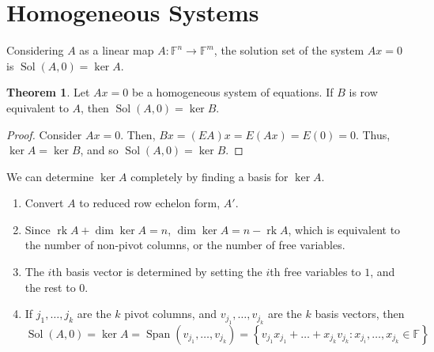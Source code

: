 \documentclass[letterpaper,12pt]{article}
\theoremstyle{definition}
\newtheorem*{theorem}{Theorem}
\newcommand{\set}[1]{\left\{ #1 \right\}}
\DeclareMathOperator{\Span}{Span}
\DeclareMathOperator{\rk}{rk}
\DeclareMathOperator{\sol}{Sol}
\begin{document}
\section*{Homogeneous Systems}
Considering $A$ as a linear map $A: \mathbb{F}^n \rightarrow \mathbb{F}^m$, the solution set of the system $Ax = 0$ is $\sol{(A,0)} = \ker{A}$.

\begin{theorem}
Let $Ax = 0$ be a homogeneous system of equations. If $B$ is row equivalent to $A$, then $\sol{(A,0)} = \ker{B}$.
\end{theorem}
\begin{proof}
Consider $Ax = 0$. Then, $Bx = (EA)x = E(Ax) = E(0) = 0$. Thus, $\ker{A} = \ker{B}$, and so $\sol{(A,0)} = \ker{B}$.
\end{proof}

We can determine $\ker{A}$ completely by finding a basis for $\ker{A}$.
\begin{enumerate}
    \item Convert $A$ to reduced row echelon form, $A'$.
    \item Since $\rk{A} + \dim{\ker{A}} = n$, $\dim{\ker{A}} = n - \rk{A}$, which is equivalent to the number of non-pivot columns, or the number of free variables.
    \item The $i$th basis vector is determined by setting the $i$th free variables to $1$, and the rest to $0$.
    \item If $j_1, \dots, j_k$ are the $k$ pivot columns, and $v_{j_1}, \dots, v_{j_k}$ are the $k$ basis vectors, then
    \begin{equation*}
        \sol{(A,0)} = \ker{A} = \Span{(v_{j_1}, \dots, v_{j_k})} = \set{v_{j_1} x_{j_1} + \dots + x_{j_k} v_{j_k}: x_{j_i}, \dots, x_{j_k} \in \mathbb{F}}
    \end{equation*}
\end{enumerate}
\end{document}
